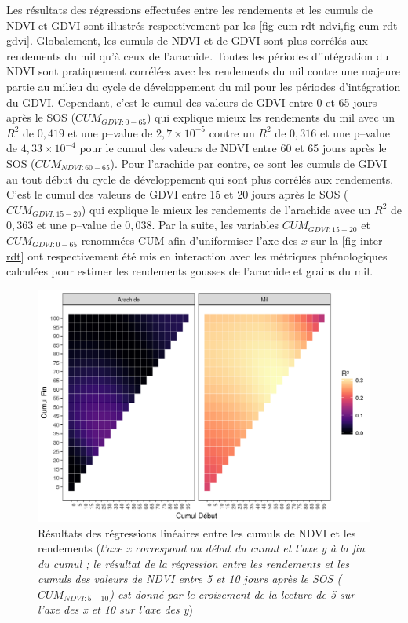 Les résultats des régressions effectuées entre les rendements et les cumuls de NDVI et GDVI sont illustrés respectivement par les \cref{fig-cum-rdt-ndvi,fig-cum-rdt-gdvi}. Globalement, les cumuls de NDVI et de GDVI sont plus corrélés aux rendements du mil qu’à ceux de l’arachide. Toutes les périodes d’intégration du NDVI sont pratiquement corrélées avec les rendements du mil contre une majeure partie au milieu du cycle de développement du mil pour les périodes d’intégration du GDVI. Cependant, c’est le cumul des valeurs de GDVI entre 0 et 65 jours après le SOS ($CUM_{GDVI:0-65}$) qui explique mieux les rendements du mil avec un $R^{2}$ de $0,419$ et une p--value de $2,7\times10^{-5}$ contre un $R^{2}$ de $0, 316$ et une p--value de $4,33\times10^{-4}$ pour le cumul des valeurs de NDVI entre 60 et 65 jours après le SOS ($CUM_{NDVI:60-65}$). Pour l’arachide par contre, ce sont les cumuls de GDVI au tout début du cycle de développement qui sont plus corrélés aux rendements. C’est le cumul des valeurs de GDVI entre 15 et 20 jours après le SOS ($CUM_{GDVI:15-20}$) qui explique le mieux les rendements de l’arachide avec un $R^{2}$ de $0,363$ et une p--value de $0,038$. Par la suite, les variables $CUM_{GDVI:15-20}$ et $CUM_{GDVI:0-65}$ renommées CUM afin d’uniformiser l’axe des $x$ sur la \cref{fig-inter-rdt} ont respectivement été mis en interaction avec les métriques phénologiques calculées pour estimer les rendements gousses de l’arachide et grains du mil.

\begin{figure}[htbp]
 \begin{center}
  \includegraphics[scale=0.7]{resultats_discussions/Cum_Rdt_NDVI.png} 
 \end{center}
 \caption[Régressions linéaires entre cumuls de NDVI et rendements]{Résultats des régressions linéaires entre les cumuls de NDVI et les rendements (\emph{l’axe x correspond au début du cumul et l’axe y à la fin du cumul ; le résultat de la régression entre les rendements et les cumuls des valeurs de NDVI entre 5 et 10 jours après le SOS ($CUM_{NDVI:5-10}$) est donné par le croisement de la lecture de 5 sur l’axe des x et 10 sur l’axe des y})}
 \label{fig-cum-rdt-ndvi}
\end{figure}

